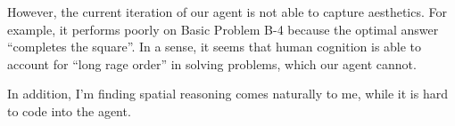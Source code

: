 \documentclass[10pt,letterpaper]{article}
\begin{document}
However, the current iteration of our agent is not able to capture aesthetics. For example, it performs poorly on Basic Problem B-4 because the optimal answer ``completes the square''. In a sense, it seems that human cognition is able to account for ``long rage order'' in solving problems, which our agent cannot. 

In addition, I'm finding spatial reasoning comes naturally to me, while it is hard to code into the agent. 
\end{document}
